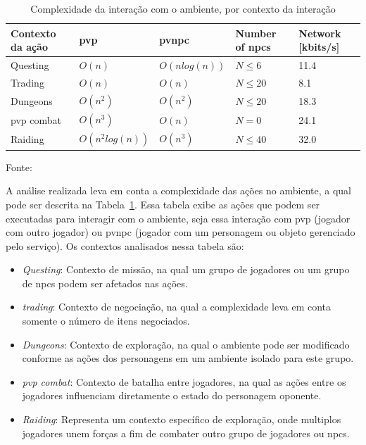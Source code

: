 \begin{table}[htb!]
\centering
\caption{Complexidade da interação com o ambiente, por contexto da interação}
\label{tab:complexidade}
\begin{tabular}{|l|l|l|l|l|}
\hline
Contexto da ação        & \ac{pvp}           & \ac{pvnpc}              & Number of \ac{npcs}    & Network {[}kbits/s{]} \\ \hline
Questing                & $O(n)$             & $O(n log(n))$           & $N \leq 6 $            & 11.4          \\ \hline
Trading                 & $O(n)$             & $O(n)$                  & $N \leq 20$            & 8.1           \\ \hline
Dungeons                & $O(n^2)$           & $O(n^2)$                & $N \leq 20$            & 18.3          \\ \hline
\ac{pvp} combat         & $O(n^3)$           & $O(n)$                  & $N = 0    $            & 24.1          \\ \hline
Raiding                 & $O(n^2 log(n))$    & $O(n^3)$                & $N \leq 40$            & 32.0          \\ \hline
\end{tabular}

Fonte:~\cite{6374456}
\end{table}



A análise realizada leva em conta a complexidade das ações no ambiente, a qual pode ser descrita na Tabela~\ref{tab:complexidade}.
%
Essa tabela exibe as ações que podem ser executadas para interagir com o ambiente, seja essa interação com \ac{pvp} (jogador com outro jogador) ou \ac{pvnpc} (jogador com um personagem ou objeto gerenciado pelo serviço).
%
Os contextos analisados nessa tabela são:

\begin{itemize}
  \item \textit{Questing}: Contexto de missão, na qual um grupo de jogadores ou um grupo de \ac{npcs} podem ser afetados nas ações.
  \item \textit{trading}: Contexto de negociação, na qual a complexidade leva em conta somente o número de itens negociados.
  \item \textit{Dungeons}: Contexto de exploração, na qual o ambiente pode ser modificado conforme as ações dos personagens em um ambiente isolado para este grupo.
  \item \textit{\ac{pvp} combat}: Contexto de batalha entre jogadores, na qual as ações entre os jogadores influenciam diretamente o estado do personagem oponente.
  \item \textit{Raiding}: Representa um contexto específico de exploração, onde multiplos jogadores unem forças a fim de combater outro grupo de jogadores ou \ac{npcs}.
\end{itemize}


